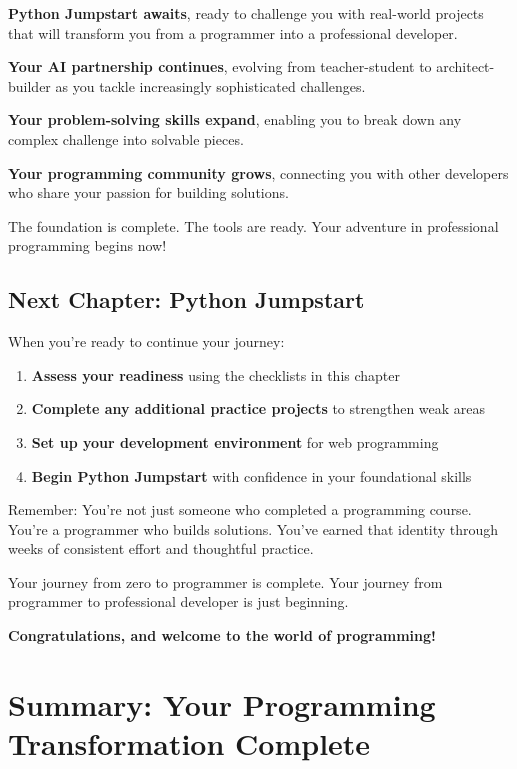 \documentclass[
  letterpaper,
  DIV=11,
  numbers=noendperiod,
  oneside]{scrreprt}
\providecommand{\tightlist}{%
  \setlength{\itemsep}{0pt}\setlength{\parskip}{0pt}}\usepackage{longtable,booktabs,array}
\begin{document}
\textbf{Python Jumpstart awaits}, ready to challenge you with real-world
projects that will transform you from a programmer into a professional
developer.

\textbf{Your AI partnership continues}, evolving from teacher-student to
architect-builder as you tackle increasingly sophisticated challenges.

\textbf{Your problem-solving skills expand}, enabling you to break down
any complex challenge into solvable pieces.

\textbf{Your programming community grows}, connecting you with other
developers who share your passion for building solutions.

The foundation is complete. The tools are ready. Your adventure in
professional programming begins now!

\section{Next Chapter: Python
Jumpstart}\label{next-chapter-python-jumpstart}

When you're ready to continue your journey:

\begin{enumerate}
\def\labelenumi{\arabic{enumi}.}
\tightlist
\item
  \textbf{Assess your readiness} using the checklists in this chapter
\item
  \textbf{Complete any additional practice projects} to strengthen weak
  areas
\item
  \textbf{Set up your development environment} for web programming
\item
  \textbf{Begin Python Jumpstart} with confidence in your foundational
  skills
\end{enumerate}

Remember: You're not just someone who completed a programming course.
You're a programmer who builds solutions. You've earned that identity
through weeks of consistent effort and thoughtful practice.

Your journey from zero to programmer is complete. Your journey from
programmer to professional developer is just beginning.

\textbf{Congratulations, and welcome to the world of programming! 🚀}


\chapter{Summary: Your Programming Transformation
Complete}\label{summary-your-programming-transformation-complete}
\end{document}
